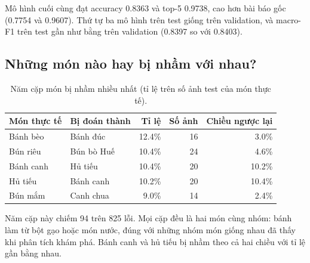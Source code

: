 Mô hình cuối cùng đạt accuracy 0.8363 và top-5 0.9738, cao hơn bài báo gốc (0.7754 và 0.9607). Thứ tự ba mô hình trên
test giống trên validation, và macro-F1 trên test gần như bằng trên validation (0.8397 so với 0.8403).




\subsection{Những món nào hay bị nhầm với nhau?}

\begin{table}[H]\centering
\caption{Năm cặp món bị nhầm nhiều nhất (tỉ lệ trên số ảnh test của món thực tế).}\label{tab:img-pairs}
\begin{tabular}{llrrr}
\toprule
Món thực tế & Bị đoán thành & Tỉ lệ & Số ảnh & Chiều ngược lại \\
\midrule
Bánh bèo & Bánh đúc & 12.4\% & 16 & 3.0\% \\
Bún riêu & Bún bò Huế & 10.4\% & 24 & 4.6\% \\
Bánh canh & Hủ tiếu & 10.4\% & 20 & 10.2\% \\
Hủ tiếu & Bánh canh & 10.2\% & 20 & 10.4\% \\
Bún mắm & Canh chua & 9.0\% & 14 & 2.4\% \\
\bottomrule
\end{tabular}
\end{table}


Năm cặp này chiếm 94 trên 825 lỗi. Mọi cặp đều là hai món cùng nhóm: bánh làm từ bột gạo hoặc món nước, đúng với những
nhóm món giống nhau đã thấy khi phân tích khám phá. Bánh canh và hủ tiếu bị nhầm theo cả hai chiều với tỉ lệ gần bằng
nhau.

